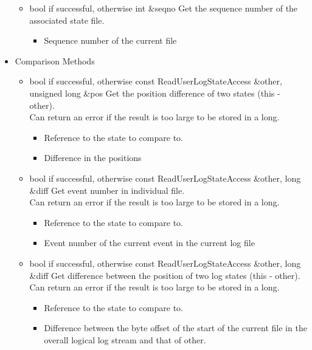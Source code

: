 \begin{itemize}
\begin{itemize}
\item {}
  {bool} { if successful,  otherwise}
  {int \&seqno}
  {Get the sequence number of the associated state file.}
  \begin{itemize}
  \item {}
    Sequence number of the current file
  \end{itemize}
\end{itemize}

\item Comparison Methods
\begin{itemize}

\item {}
  {bool} { if successful,  otherwise}
  {const ReadUserLogStateAccess \&other, unsigned long \&pos}
  {Get the position difference of two states (this - other).
    \\ \Note Can return an error if the result is too large to be
    stored in a long.}
  \begin{itemize}
  \item {}
    Reference to the state to compare to.
  \item {}
    Difference in the positions
  \end{itemize}

\item {}
  {bool} { if successful,  otherwise}
  {const ReadUserLogStateAccess \&other, long \&diff}
  {Get event number in individual file.
    \\ \Note Can return an error if the result is too large to be
    stored in a long.}
  \begin{itemize}
  \item {}
    Reference to the state to compare to.
  \item {} Event number of the current event in
    the current log file
  \end{itemize}

\item {}
  {bool} { if successful,  otherwise}
  {const ReadUserLogStateAccess \&other, long \&diff}
  {Get difference between the position of two log states (this - other).
    \\ \Note Can return an error if the result is too large
    to be stored in a long.}
  \begin{itemize}
  \item {}
    Reference to the state to compare to.
  \item {}
    Difference between the byte offset of the start of the current
    file in the overall logical log stream and that of other.
  \end{itemize}


\end{itemize}
\end{itemize}
